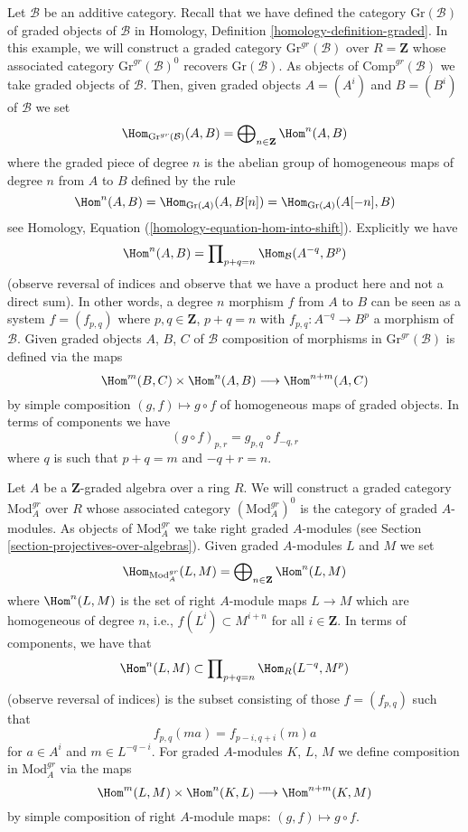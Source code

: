 \begin{example}
\label{example-graded-category-graded-objects}
Let $\mathcal{B}$ be an additive category. Recall that we have defined
the category $\text{Gr}(\mathcal{B})$ of graded objects of $\mathcal{B}$ in
Homology, Definition \ref{homology-definition-graded}.
In this example, we will construct a graded category
$\text{Gr}^{gr}(\mathcal{B})$ over $R = \mathbf{Z}$
whose associated category $\text{Gr}^{gr}(\mathcal{B})^0$
recovers $\text{Gr}(\mathcal{B})$.
As objects of $\text{Comp}^{gr}(\mathcal{B})$
we take graded objects of $\mathcal{B}$. Then, given graded objects
$A = (A^i)$ and $B = (B^i)$ of $\mathcal{B}$ we set
$$
\Hom_{\text{Gr}^{gr}(\mathcal{B})}(A, B) =
\bigoplus\nolimits_{n \in \mathbf{Z}} \Hom^n(A, B)
$$
where the graded piece of degree $n$ is the abelian group of homogeneous
maps of degree $n$ from $A$ to $B$
defined by the rule
$$
\Hom^n(A, B) = \Hom_{\text{Gr}(\mathcal{A})}(A, B[n]) =
\Hom_{\text{Gr}(\mathcal{A})}(A[-n], B)
$$
see Homology, Equation (\ref{homology-equation-hom-into-shift}).
Explicitly we have
$$
\Hom^n(A, B) = \prod\nolimits_{p + q = n} \Hom_\mathcal{B}(A^{-q}, B^p)
$$
(observe reversal of indices and observe that we have a product here and
not a direct sum). In other words, a degree $n$ morphism $f$
from $A$ to $B$ can be seen as a system $f = (f_{p, q})$ where
$p, q \in \mathbf{Z}$, $p + q = n$ with
$f_{p, q} : A^{-q} \to B^p$ a morphism of $\mathcal{B}$.
Given graded objects $A$, $B$, $C$ of $\mathcal{B}$
composition of morphisms in $\text{Gr}^{gr}(\mathcal{B})$ is defined
via the maps
$$
\Hom^m(B, C) \times \Hom^n(A, B) \longrightarrow \Hom^{n + m}(A, C)
$$
by simple composition $(g, f) \mapsto g \circ f$ of homogeneous
maps of graded objects. In terms of components we have
$$
(g \circ f)_{p, r} = g_{p, q} \circ f_{-q, r}
$$
where $q$ is such that $p + q = m$ and $-q + r = n$.
\end{example}

\begin{example}
\label{example-gm-gr-cat}
Let $A$ be a $\mathbf{Z}$-graded algebra over a ring $R$. We will construct
a graded category $\text{Mod}^{gr}_A$ over $R$ whose associated category
$(\text{Mod}^{gr}_A)^0$ is the category of graded $A$-modules. As objects
of $\text{Mod}^{gr}_A$ we take right graded $A$-modules (see
Section \ref{section-projectives-over-algebras}). Given graded
$A$-modules $L$ and $M$ we set
$$
\Hom_{\text{Mod}^{gr}_A}(L, M) =
\bigoplus\nolimits_{n \in \mathbf{Z}} \Hom^n(L, M)
$$
where $\Hom^n(L, M)$ is the set of right $A$-module maps $L \to M$ which
are homogeneous of degree $n$, i.e., $f(L^i) \subset M^{i + n}$ for
all $i \in \mathbf{Z}$. In terms of components, we have that
$$
\Hom^n(L, M) \subset \prod\nolimits_{p + q = n} \Hom_R(L^{-q}, M^p)
$$
(observe reversal of indices) is the subset consisting of those
$f = (f_{p, q})$ such that
$$
f_{p, q}(m a) = f_{p - i, q + i}(m)a
$$
for $a \in A^i$ and $m \in L^{-q - i}$. For graded $A$-modules
$K$, $L$, $M$ we define composition in $\text{Mod}^{gr}_A$ via
the maps
$$
\Hom^m(L, M) \times \Hom^n(K, L) \longrightarrow \Hom^{n + m}(K, M)
$$
by simple composition of right $A$-module maps: $(g, f) \mapsto g \circ f$.
\end{example}

